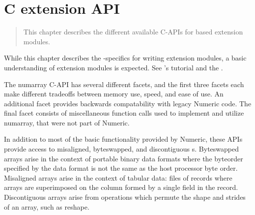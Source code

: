 \chapter{C extension API}
\label{cha:C-API}

\begin{quote}
   This chapter describes the different available C-APIs for 
   based extension modules.
\end{quote}

While this chapter describes the \module{\numarray}-specifics for writing
extension modules, a basic understanding of \python extension modules is
expected. See \python's  tutorial and the
.

The numarray C-API has several different facets, and the first three facets
each make different tradeoffs between memory use, speed, and ease of use.  An
additional facet provides backwards compatability with legacy Numeric code.
The final facet consists of miscellaneous function calls used to implement
and utilize numarray, that were not part of Numeric.

In addition to most of the basic functionality provided by Numeric, these APIs
provide access to misaligned, byteswapped, and discontiguous s.
Byteswapped arrays arise in the context of portable binary data formats where
the byteorder specified by the data format is not the same as the host
processor byte order.  Misaligned arrays arise in the context of tabular data:
files of records where arrays are superimposed on the column formed by a single
field in the record.  Discontiguous arrays arise from operations which permute
the shape and strides of an array, such as reshape.

